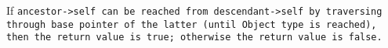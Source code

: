 If \tt{ancestor->self} can be reached from \tt{descendant->self} by traversing
through \tt{base} pointer of the latter (until \tt{Object} type is reached),
then the return value is \tt{true}; otherwise the return value is \tt{false}.
